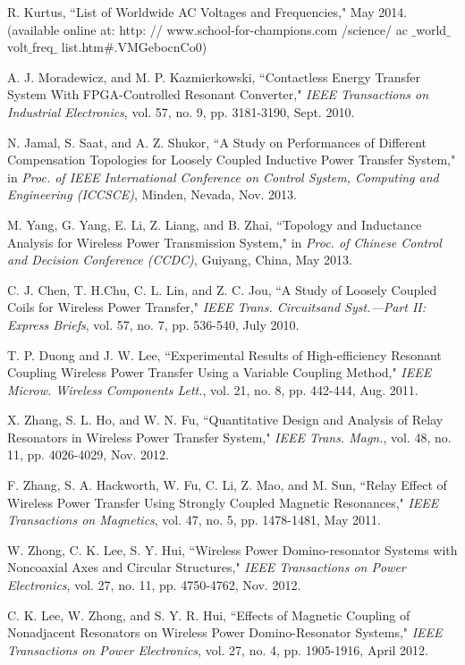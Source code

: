 \documentclass[twocolumn,10pt]{IEEEtran}
\begin{document}
\begin{thebibliography}{99}
R. Kurtus, ``List of Worldwide AC Voltages and Frequencies," May 2014. (available online at: http: // www.school-for-champions.com /science/ ac $\_$world$\_$ volt$\_$freq$\_$ list.htm$\#$.VMGebocnCo0) 

A. J. Moradewicz, and M. P. Kazmierkowski, ``Contactless Energy Transfer System With FPGA-Controlled Resonant Converter," \emph{IEEE Transactions on Industrial Electronics}, vol. 57, no. 9, pp. 3181-3190, Sept. 2010.


N. Jamal, S. Saat, and A. Z. Shukor, ``A Study on Performances of Different Compensation Topologies for Loosely Coupled Inductive Power Transfer System,"  in \emph{Proc. of IEEE International Conference on 
Control System, Computing and Engineering (ICCSCE)},  Minden, Nevada, Nov. 2013.

 M. Yang, G. Yang, E. Li, Z. Liang, and B. Zhai, ``Topology and Inductance Analysis for Wireless Power Transmission System," in \emph{Proc. of Chinese Control and Decision Conference (CCDC)}, Guiyang, China, May 2013.


C. J. Chen, T. H.Chu, C. L. Lin, and Z. C. Jou, ``A Study of Loosely Coupled Coils for Wireless Power Transfer," \emph{IEEE Trans. Circuitsand Syst.—Part II: Express Briefs}, vol. 57, no. 7, pp. 536-540, July 2010.

T. P. Duong and J. W. Lee, ``Experimental Results of High-efficiency Resonant Coupling Wireless Power Transfer Using a Variable Coupling Method," \emph{IEEE Microw. Wireless Components Lett.}, vol. 21, no. 8, pp. 442-444, Aug. 2011.

 X. Zhang, S. L. Ho, and W. N. Fu, ``Quantitative Design and Analysis of Relay Resonators in Wireless Power Transfer System," \emph{IEEE Trans. Magn.}, vol. 48, no. 11, pp. 4026-4029, Nov. 2012.


 F. Zhang, S. A. Hackworth, W. Fu, C. Li, Z. Mao, and M. Sun, ``Relay Effect of Wireless Power Transfer Using Strongly Coupled Magnetic Resonances," \emph{IEEE Transactions on Magnetics}, vol. 47, no. 5, pp. 1478-1481, May 2011.

   W. Zhong, C. K. Lee, S. Y. Hui, ``Wireless Power Domino-resonator Systems with Noncoaxial Axes and Circular Structures," \emph{IEEE Transactions on Power Electronics}, vol. 27, no. 11, pp. 4750-4762, Nov. 2012.
 
   C. K. Lee, W. Zhong, and S. Y. R. Hui, ``Effects of Magnetic Coupling of Nonadjacent Resonators on Wireless Power Domino-Resonator Systems," \emph{IEEE Transactions on Power Electronics}, vol. 27, no. 4, pp. 1905-1916, April 2012.
 

\end{thebibliography}
\end{document}
